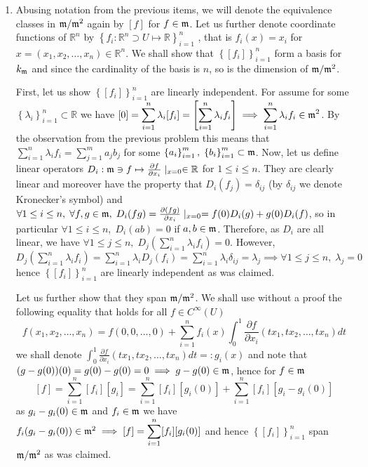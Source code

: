 \documentclass[8pt]{article} %
\begin{document}
\begin{enumerate}[label=\bfseries Problem \arabic*.]
{\begin{enumerate}[label=(\arabic*).]
{			First, $F$ respects addition, for
			\[F([f]+[g])=F([f+g])=(f+g)(0)=F([f])+F([g])\]
			and also multiplication, for
			\[F([f][g])=F([fg])=(fg)(0)=F(f)F(g)\]
			it also maps $[1]\in k_{\m}$ (which is an identity element in $k_{\m}$) to 1, as
			\[F([1])=1\]
			moreover, it is onto, as for $\forall a\in\mathbb{R}$ holds
			\[F([a])=a\]
			and bijective, for $F([f])=F([g])\implies f(0)=g(0)\implies (f-g)(0)=0\implies f-g\in\m\implies [f]=[g]$. Altogether
			these properties show that $F$ is indeed a field isomorphism between $k_{\m}$ and $\mathbb{R}$.
			}
		\item{Abusing notation from the previous items, we will denote the equivalence classes in $\mathfrak{m}/\mathfrak{m}^2$ again by $[f]$ for
			$f\in\mathfrak{m}$. 
			Let us further denote coordinate functions of $\mathbb{R}^n$ by
			$\left\{f_i:\mathbb{R}^n\supset U\mapsto\mathbb{R}\right\}_{i=1}^n$
			, that is $f_i(x)=x_i$ for
			$x=(x_1,x_2,\dots,x_n)\in\mathbb{R}^n$. We shall show that $\left\{[f_i]\right\}_{i=1}^n$
			form a basis for $k_{\m}$ and since the cardinality of the basis is $n$, so is the dimension of $\mathfrak{m}/\mathfrak{m}^2$.}

			First, let us show $\left\{[f_i]\right\}_{i=1}^n$ are linearly independent. For assume for some $\left\{\lambda_i\right\}_{
			i=1}^n\subset\mathbb{R}$ we have $[0]=\sum_{i=1}^n\lambda_i[f_i]=\left[\sum_{i=1}^n\lambda_if_i\right]\implies
			\sum_{i=1}^n\lambda_if_i\in\m^2$. By the observation from the previous problem this means that $\sum_{i=1}^n\lambda_if_i=
			\sum_{j=1}^m a_jb_j$ for some $\left\{a_i\right\}_{i=1}^{m},\;\left\{b_i\right\}_{i=1}^{m}\subset\mathfrak{m}$. Now, let us define linear operators
			$D_i:\mathfrak{m}\ni f\mapsto \frac{\partial f}{\partial x_i}\mid_{x=0}\in\mathbb{R}$ for $1\leq i\leq n$. They are clearly linear
			and moreover have the property that $D_i(f_j)=\delta_{ij}$ (by $\delta_{ij}$ we denote Kronecker's symbol) and
			$\forall 1\leq i\leq n,\;\forall f,g\in\mathfrak{m},\;D_i(fg)=\frac{\partial (fg)}{\partial x_i}\mid_{x=0}=f(0)D_i(g)+g(0)D_i(f)$,
			so in particular $\forall 1\leq i\leq n,\;D_i(ab)=0$ if $a,b\in\mathfrak{m}$. Therefore, as $D_i$ are all linear, we have
			$\forall 1\leq j\leq n,\;D_j(\sum_{i=1}^n\lambda_if_i)=0$. However, $D_j(\sum_{i=1}^n\lambda_if_i)=
			\sum_{i=1}^n\lambda_iD_j(f_i)=\sum_{i=1}^n\lambda_i\delta_{ij}=\lambda_j\implies \forall 1\leq j\leq n,\;\lambda_j=0$ hence
			$\left\{[f_i]\right\}_{i=1}^n$ are linearly independent as was claimed.

			Let us further show that they span $\mathfrak{m}/\mathfrak{m}^2$. We shall use without a proof the following equality that holds for all
			$f\in C^{\infty}(U)$
			\[f(x_1,x_2,\dots,x_n)=f(0,0,\dots,0)+\sum_{i=1}^nf_i(x)\int_0^1\frac{\partial f}{\partial x_i}(tx_1,tx_2,\dots,tx_n)dt\]
			we shall denote $\int_0^1\frac{\partial f}{\partial x_i}(tx_1,tx_2,\dots,tx_n)dt=:g_i(x)$ and note that
			$(g-g(0))(0)=g(0)-g(0)=0\implies g-g(0)\in\mathfrak{m}$, hence for $f\in\mathfrak{m}$
			\[[f]=\sum_{i=1}^n[f_i][g_i]=\sum_{i=1}^n[f_i][g_i(0)]+\sum_{i=1}^n[f_i][g_i-g_i(0)]\]
			as $g_i-g_i(0)\in\mathfrak{m}$ and $f_i\in\mathfrak{m}$ we have $f_i(g_i-g_i(0))\in\m^2\implies
			[f]=\sum_{i=1}^n[f_i][g_i(0)]$ and hence $\left\{[f_i]\right\}_{i=1}^n$ span $\mathfrak{m}/\mathfrak{m}^2$ as was claimed.
		\end{enumerate}
		}
\end{enumerate}
\end{document}
